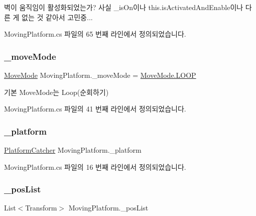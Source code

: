 벽이 움직임이 활성화되었는가? 사실 \+\_\+is\+On이나 this.\+is\+Activated\+And\+Enable이나 다른 게 없는 것 같아서 고민중... 

Moving\+Platform.\+cs 파일의 65 번째 라인에서 정의되었습니다.

\mbox{\label{class_moving_platform_a47308284bdf720a8fe919a69f2c0019b}} 
\subsubsection{\texorpdfstring{\_moveMode}{\_moveMode}}
{\footnotesize\ttfamily \mbox{\hyperlink{class_moving_platform_a7b3427d2906069ecf4c39d69eee53653}{Move\+Mode}} Moving\+Platform.\+\_\+move\+Mode = \mbox{\hyperlink{class_moving_platform_a7b3427d2906069ecf4c39d69eee53653a9159b3578e4e1eb31ffdf90acd6f6e40}{Move\+Mode.\+L\+O\+OP}}}



기본 Move\+Mode는 Loop(순회하기) 



Moving\+Platform.\+cs 파일의 41 번째 라인에서 정의되었습니다.

\mbox{\label{class_moving_platform_a2269ebd689de9ad6368f64b6b14cecb6}} 
\subsubsection{\texorpdfstring{\_platform}{\_platform}}
{\footnotesize\ttfamily \mbox{\hyperlink{class_platform_catcher}{Platform\+Catcher}} Moving\+Platform.\+\_\+platform\hspace{0.3cm}{\ttfamily [private]}}



Moving\+Platform.\+cs 파일의 16 번째 라인에서 정의되었습니다.

\mbox{\label{class_moving_platform_a51c0ce96c3fc6ad9350dc0350216835b}} 
\subsubsection{\texorpdfstring{\_posList}{\_posList}}
{\footnotesize\ttfamily List$<$Transform$>$ Moving\+Platform.\+\_\+pos\+List}



